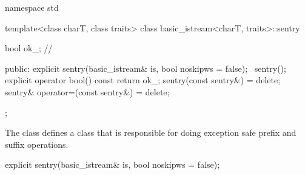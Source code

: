 %
%
\begin{codeblock}
namespace std {
  template<class charT, class traits>
  class basic_istream<charT, traits>::sentry {
    bool ok_;                   // \expos

  public:
    explicit sentry(basic_istream& is, bool noskipws = false);
    ~sentry();
    explicit operator bool() const { return ok_; }
    sentry(const sentry&) = delete;
    sentry& operator=(const sentry&) = delete;
  };
}
\end{codeblock}

\begin{itemdescr}
\pnum
The class
defines a class that is responsible for doing exception safe prefix and suffix
operations.
\end{itemdescr}

%
%
\begin{itemdecl}
explicit sentry(basic_istream& is, bool noskipws = false);
\end{itemdecl}

